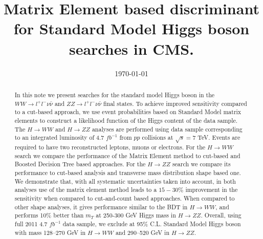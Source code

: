 \documentclass{cmspaper}
\begin{document}


\title{Matrix Element based discriminant for Standard Model Higgs boson searches in CMS.}






\date{\today}

\begin{abstract}
In this note we present searches for the standard model Higgs boson in the $WW \rightarrow l^{+}l^{-}\nu\bar{\nu}$ and $ZZ \rightarrow l^{+}l^{-}\nu\bar{\nu}$ 
final states. To achieve improved sensitivity compared to a cut-based approach, we use event probabilities based on Standard Model matrix elements to construct a likelihood function of the Higgs content of the data sample. The $H\rightarrow WW$ and $H\rightarrow ZZ$ analyses are performed using data sample corresponding to an integrated luminosity of 4.7 $fb^{-1}$  from $pp$ collisions at $\sqrt{s}=7$ TeV.
Events are required to have two reconstructed leptons, muons or electrons. For the $H\rightarrow WW$ search we compare the performance of the 
Matrix Element method to cut-based and Boosted Decision Tree based approaches. For the $H\rightarrow ZZ$ search we compare its performance to cut-based analysis and transverse mass distribution shape based one. We demonstrate that, with all systematic uncertainties taken into account, in both analyses use of the matrix element method leads to a $15-30 \%$ improvement in the sensitivity when compared to cut-and-count based approaches. When compared to other shape analyses, it gives performance similar to the BDT in $H\rightarrow WW$, and performs 10\% better than $m_{T}$ at 250-300 GeV Higgs mass in $H\rightarrow ZZ$. Overall, using full 2011 4.7 $fb^{-1}$ data sample, we exclude at 95\% C.L. Standard Model Higgs boson with mass 128--270 GeV in $H\rightarrow WW$ and 290--520 GeV in $H\rightarrow ZZ$.  
\end{abstract}
\end{document}
